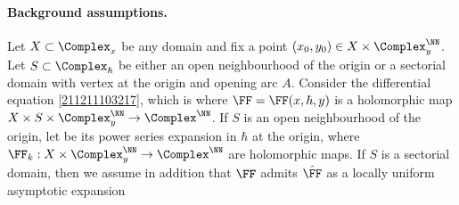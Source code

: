 \documentclass[11pt]{article}
\begin{document}

\paragraph{Background assumptions.}
\label{220223113827}
Let $X \subset \Complex_x$ be any domain and fix a point $(x_0, y_0) \in X \times \Complex^\NN_y$.
Let $S \subset \Complex_\hbar$ be either an open neighbourhood of the origin or a sectorial domain with vertex at the origin and opening arc $A$.
Consider the differential equation \eqref{211211103217}, which is
where $\FF = \FF (x, \hbar, y)$ is a holomorphic map $X \times S \times \Complex_y^\NN \to \Complex^\NN$.
If $S$ is an open neighbourhood of the origin, let
be its power series expansion in $\hbar$ at the origin, where $\FF_k : X \times \Complex^\NN_y \to \Complex^\NN$ are holomorphic maps.
If $S$ is a sectorial domain, then we assume in addition that $\FF$ admits $\hat{\FF}$ as a locally uniform asymptotic expansion
\end{document}
